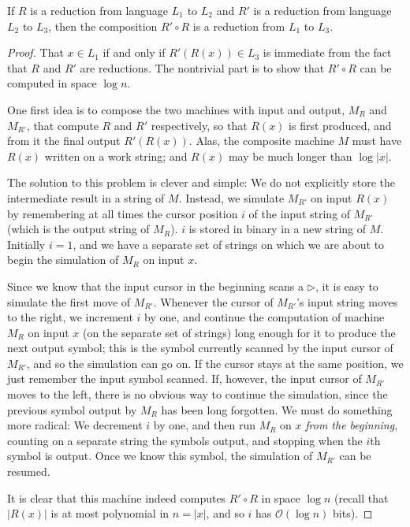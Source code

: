 \documentclass[12pt]{article}
\begin{document}
\begin{defbox}
  If $R$ is a reduction from language $L_1$ to $L_2$ and $R'$ is a reduction from language $L_2$ to $L_3$, then the composition $R' \circ R$ is a reduction from $L_1$ to $L_3$.
\end{defbox}
\begin{proof}
  That $x \in L_1$ if and only if $R'(R(x)) \in L_3$ is immediate from the fact that $R$ and $R'$ are reductions. The nontrivial part is to show that $R' \circ R$ can be computed in space $\log n$.

One first idea is to compose the two machines with input and output, $M_R$ and $M_{R'}$, that compute $R$ and $R'$ respectively, so that $R(x)$ is first produced, and from it the final output $R'(R(x))$. Alas, the composite machine $M$ must have $R(x)$ written on a work string; and $R(x)$ may be much longer than $\log |x|$.

The solution to this problem is clever and simple: We do not explicitly store the intermediate result in a string of $M$. Instead, we simulate $M_{R'}$ on input $R(x)$ by remembering at all times the cursor position $i$ of the input string of $M_{R'}$ (which is the output string of $M_R$). $i$ is stored in binary in a new string of $M$. Initially $i = 1$, and we have a separate set of strings on which we are about to begin the simulation of $M_R$ on input $x$.

Since we know that the input cursor in the beginning scans a $\triangleright$, it is easy to simulate the first move of $M_{R'}$. Whenever the cursor of $M_{R'}$'s input string moves to the right, we increment $i$ by one, and continue the computation of machine $M_R$ on input $x$ (on the separate set of strings) long enough for it to produce the next output symbol; this is the symbol currently scanned by the input cursor of $M_{R'}$, and so the simulation can go on. If the cursor stays at the same position, we just remember the input symbol scanned. If, however, the input cursor of $M_{R'}$ moves to the left, there is no obvious way to continue the simulation, since the previous symbol output by $M_R$ has been long forgotten. We must do something more radical: We decrement $i$ by one, and then run $M_R$ on $x$ \textit{from the beginning}, counting on a separate string the symbols output, and stopping when the $i$th symbol is output. Once we know this symbol, the simulation of $M_{R'}$ can be resumed. 

It is clear that this machine indeed computes $R' \circ R$ in space $\log n$ (recall that $|R(x)|$ is at most polynomial in $n = |x|$, and so $i$ has $\mathcal{O}(\log n)$ bits).
\end{proof}
\end{document}
